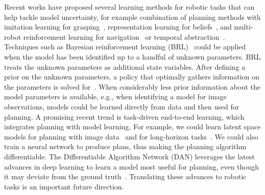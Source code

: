 \documentclass[journal]{IEEEtran}
\begin{document}
%
{Recent works have proposed several learning methods for robotic tasks that can help tackle model uncertainty, for example combination of planning methods with imitation learning for grasping~\cite{garg2019learning}, representation learning for beliefs~\cite{Nguyen20}, and multi-robot reinforcement learning for navigation~\cite{Wang20model} or temporal abstraction~\cite{Xiao20}.}
{Techniques such as Bayesian reinforcement learning (BRL)~\cite{ghavamzadeh2015bayesian} could be applied when} the model has been identified up to a handful of unknown parameters.
BRL treats the unknown parameters as additional state variables.
After defining a prior on the unknown parameters, a policy that optimally gathers information on the parameters is solved for~\cite{BaiHsu13a,ross2008bayesian,slade2017simultaneous}.
%
%
When considerably less prior information about the model parameters is available, e.g., when identifying a model for image observations, models could be  learned directly from data and then used for planning.
%
%
A promising recent trend is task-driven end-to-end learning, which integrates planning with model learning.
For example, we could learn latent space models for planning with image data~\cite{hafner2019learning} and for long-horizon tasks~\cite{schrittwieser2020mastering}. We could also {train a neural network to produce plans}, thus making the planning algorithm differentiable. The Differentiable Algorithm Network (DAN) leverages the latest advances in deep learning to learn a model most useful for planning, even though it may deviate from the ground truth~\cite{KarMa19}.
Translating these advances to robotic tasks is an important future direction.


%
%
%
%
%
%
%
%
%
%
%
%
%
%
%
%
%
%
%
%
%
%
%
%
%

%
%
%
%
%
%
%
%
%

%

%

%
%

%
%
%
%
\end{document}
